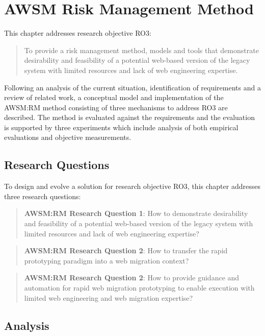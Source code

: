 \hypertarget{sec:awsm-rm}{%
\chapter{AWSM Risk Management Method}\label{sec:awsm-rm}}

This chapter addresses research objective RO3:

\begin{quote}
To provide a risk management method, models and tools that demonstrate desirability and feasibility of a potential web-based version of the legacy system with limited resources and lack of web engineering expertise.
\end{quote}

Following an analysis of the current situation, identification of requirements and a review of related work, a conceptual model and implementation of the AWSM:RM method consisting of three mechanisms to address RO3 are described.
The method is evaluated against the requirements and the evaluation is supported by three experiments which include analysis of both empirical evaluations and objective measurements.

\hypertarget{research-questions}{%
\section{Research Questions}\label{research-questions}}

To design and evolve a solution for research objective RO3, this chapter addresses three research questions:

\begin{quote}
\textbf{AWSM:RM Research Question 1}: How to demonstrate desirability and feasibility of a potential web-based version of the legacy system with limited resources and lack of web engineering expertise?
\end{quote}

\begin{quote}
\textbf{AWSM:RM Research Question 2}: How to transfer the rapid prototyping paradigm into a web migration context?
\end{quote}

\begin{quote}
\textbf{AWSM:RM Research Question 2}: How to provide guidance and automation for rapid web migration prototyping to enable execution with limited web engineering and web migration expertise?
\end{quote}

\hypertarget{analysis}{%
\section{Analysis}\label{analysis}}

